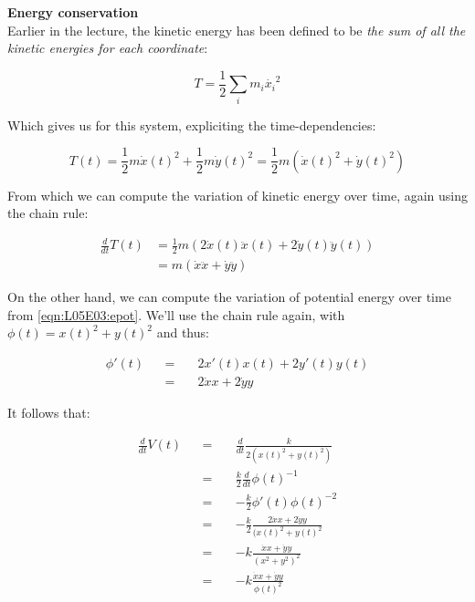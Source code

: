 \documentclass[solutions.tex]{subfiles}
\begin{document}
\hr
\textbf{Energy conservation}\ \\
Earlier in the lecture, the kinetic energy has been defined to be
\textit{the sum of all the kinetic energies for each coordinate}:

\begin{equation}
	T=\frac12\sum_i m_i \dot{x_i}^2
\end{equation}

Which gives us for this system, expliciting the time-dependencies:

\begin{equation}
	T(t)=\frac12 m \dot{x}(t)^2 + \frac12 m \dot{y}(t)^2=\frac12m(\dot{x}(t)^2+\dot{y}(t)^2)
\end{equation}

From which we can compute the variation of kinetic energy
over time, again using the chain rule:

\begin{equation}
	\label{eqn:L05E03:dkint}
	\begin{aligned}
		\frac{d}{dt}T(t) &= \frac12m(2\dot{x}(t)\ddot{x}(t)+2\dot{y}(t)\ddot{y}(t)) \\
		~ &= m(\dot{x}\ddot{x}+\dot{y}\ddot{y})
	\end{aligned}
\end{equation}

On the other hand, we can compute the variation of
potential energy over time from \eqref{eqn:L05E03:epot}.
We'll use the chain rule again, with $\phi(t)=x(t)^2+y(t)^2$
and thus:

\begin{equation*} \begin{aligned}
	\phi'(t) &&=\quad& 2x'(t)x(t)+2y'(t)y(t) \\
	~ &&=\quad& 2\dot{x}x+2\dot{y}y
\end{aligned} \end{equation*}

It follows that:

\begin{equation}
	\label{eqn:L05E03:dpott}
	\begin{aligned}
		\frac{d}{dt}V(t) &&=\quad& \frac{d}{dt}\frac{k}{2(x(t)^2+y(t)^2)} \\
		~ &&=\quad& \frac k2\frac{d}{dt}\phi(t)^{-1}\\
		~ &&=\quad& -\frac k2\phi'(t)\phi(t)^{-2}\\
		~ &&=\quad& -\frac k2\frac{2\dot{x}x+2\dot{y}y}{(x(t)^2+y(t)^2} \\
		~ &&=\quad& -k\frac{\dot{x}x+\dot{y}y}{(x^2+y^2)^2} \\
		~ &&=\quad& -k\frac{\dot{x}x+\dot{y}y}{\phi(t)^2}
	\end{aligned}
\end{equation}
\end{document}

